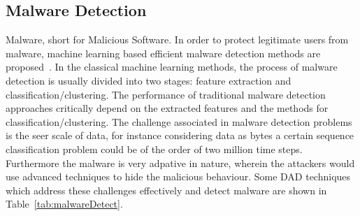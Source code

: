 \subsection{Malware Detection}
\label{sec:malwaredetection}

Malware, short for Malicious Software. In  order to protect legitimate users from malware, machine learning based efficient malware detection methods are proposed~\cite{ye2017survey}. In the classical machine learning methods, the process of malware detection is usually divided into two stages: feature extraction and classification/clustering. The performance of traditional malware detection approaches critically depend on the extracted features and the methods for classification/clustering. The challenge associated in malware detection problems is the seer scale of data, for instance considering data as bytes a certain  sequence classification problem could be  of the order of two million time steps. Furthermore the malware is very adpative in nature, wherein the attackers would use advanced techniques to hide the malicious behaviour. Some DAD techniques  which address these challenges effectively and detect malware are shown in Table~\ref{tab:malwareDetect}.

